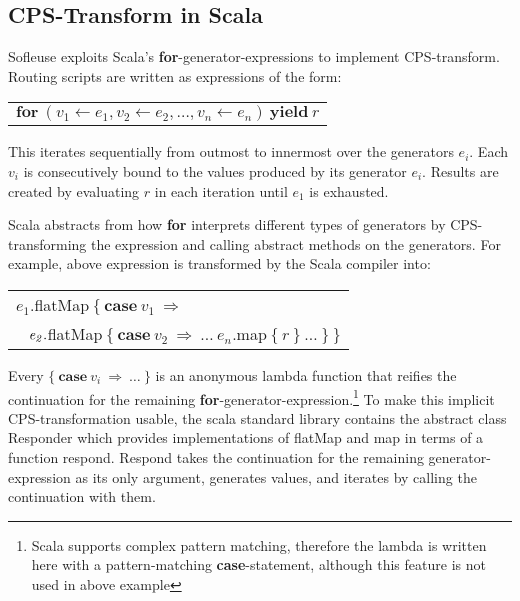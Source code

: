 \documentclass{sig-alternate}
\begin{document}
\subsection{CPS-Transform in Scala}     

Sofleuse exploits Scala's \textbf{for}-generator-expressions to implement CPS-transform. Routing
scripts are written as expressions of the form:

   
\medskip
{\footnotesize\begin{tabular}{l} $\mathbf{for}\ (\mathit{v_1} \leftarrow \mathit{e_1}, \mathit{v_2} \leftarrow
\mathit{e_2}, \ldots, \mathit{v_n} \leftarrow \mathit{e_n})\ \mathbf{yield}\ \mathit{r}$
\end{tabular}}
\medskip


This iterates sequentially from outmost to innermost over the generators $e_i$. Each $v_i$ is
consecutively bound to the values produced by its generator $e_i$. Results are created by evaluating
$r$ in each iteration until $e_1$ is exhausted.

Scala abstracts from how \textbf{for} interprets different types of generators by CPS-transforming
the expression and calling abstract methods on the generators. For example, above expression is
transformed by the Scala compiler into:


\medskip
{\footnotesize\begin{tabular}{l}
$\mathit{e_1}.$flatMap$\ \{\ \mathbf{case}\ \mathit{v_1}\ \Rightarrow$\\
$\hspace{2ex}\mathit{e_2}.$flatMap$\ \{\ \mathbf{case}\ \mathit{v_2}\ \Rightarrow\ \ldots\ \mathit{e_n}.$map$\ \{\ \mathit{r}\ \}\ \ldots\ \}\ \}$
\end{tabular}}
\medskip


Every $\{\ \mathbf{case}\ \mathit{v_i}\ \Rightarrow\ \ldots\ \}$ is an anonymous lambda function
that reifies the continuation for the remaining \textbf{for}-generator-expression.\footnote{Scala
supports complex pattern matching, therefore the lambda is written here with a pattern-matching
\textbf{case}-statement, although this feature is not used in above example} To make this implicit
CPS-transformation usable, the scala standard library contains the abstract class Responder which
provides implementations of flatMap and map in terms of a function respond. Respond takes the
continuation for the remaining generator-expression as its only argument, generates values, and
iterates by calling the continuation with them.
\end{document}
